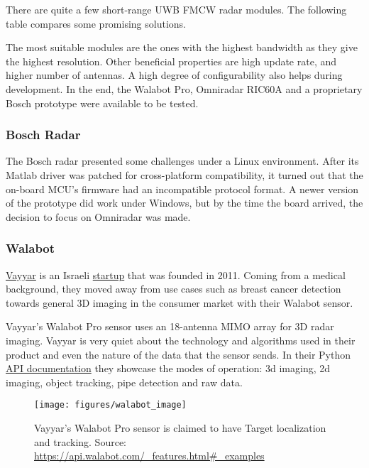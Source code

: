 There are quite a few short-range UWB FMCW radar modules. The following
table compares some promising solutions.



The most suitable modules are the ones with the highest bandwidth as
they give the highest resolution. Other beneficial properties are high
update rate, and higher number of antennas. A high degree of
configurability also helps during development. In the end, the Walabot
Pro, Omniradar RIC60A and a proprietary Bosch prototype were available
to be tested.

\subsubsection{Bosch Radar}\label{bosch-radar}

The Bosch radar presented some challenges under a Linux environment.
After its Matlab driver was patched for cross-platform compatibility, it
turned out that the on-board MCU's firmware had an incompatible protocol
format. A newer version of the prototype did work under Windows, but by
the time the board arrived, the decision to focus on Omniradar was made.

\subsubsection{Walabot}\label{walabot}

\href{https://www.vayyar.com/}{Vayyar} is an Israeli
\href{https://www.crunchbase.com/organization/vayyar}{startup} that was
founded in 2011. Coming from a medical background, they moved away from
use cases such as breast cancer detection towards general 3D imaging in
the consumer market with their Walabot sensor.

Vayyar's Walabot Pro sensor uses an 18-antenna MIMO array for 3D radar
imaging. Vayyar is very quiet about the technology and algorithms used
in their product and even the nature of the data that the sensor sends.
In their Python \href{https://api.walabot.com}{API documentation} they
showcase the modes of operation: 3d imaging, 2d imaging, object
tracking, pipe detection and raw data.

\begin{figure}[htbp]
    \centering
    \label{fig:walabot_image}
    \texttt{[image: figures/walabot\_image]}
    \caption{Vayyar's Walabot Pro sensor is claimed to have Target localization and tracking. Source: \url{https://api.walabot.com/\_features.html\#\_examples}}
\end{figure}

